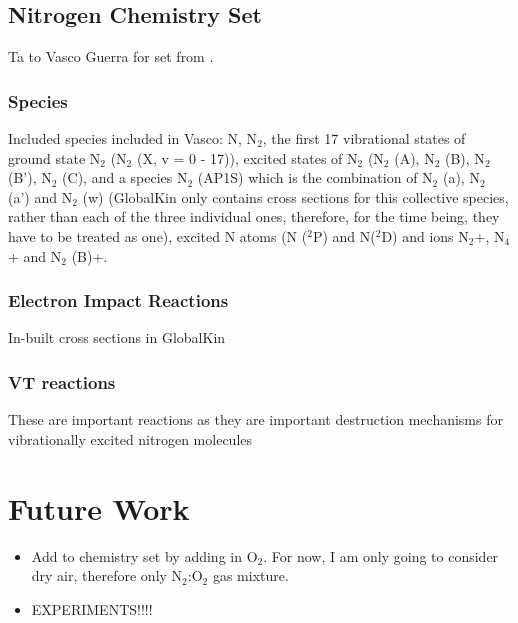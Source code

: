 \documentclass[11pt, oneside]{article}   	%
\begin{document}
\subsection{Nitrogen Chemistry Set}
Ta to Vasco Guerra for set from \cite{Kutasi2016tuning}.
\subsubsection{Species}
Included species included in Vasco: N, N$_2$, the first 17 vibrational states of ground state N$_2$ (N$_2$ (X, v = 0 - 17)), excited states of N$_2$ (N$_2$ (A), N$_2$ (B), N$_2$ (B'), N$_2$ (C), and a species N$_2$ (AP1S) which is the combination of N$_2$ (a), N$_2$ (a') and N$_2$ (w) (GlobalKin only contains cross sections for this collective species, rather than each of the three individual ones, therefore, for the time being, they have to be treated as one), excited N atoms (N ($^2$P) and N($^2$D) and ions N$_2$+, N$_4$+ and N$_2$ (B)+.
\subsubsection{Electron Impact Reactions}
In-built cross sections in GlobalKin
\subsubsection{VT reactions}
These are important reactions as they are important destruction mechanisms for vibrationally excited nitrogen molecules

\section{Future Work}
\begin{itemize}
\item Add to chemistry set by adding in O$_2$. For now, I am only going to consider dry air, therefore only N$_2$:O$_2$ gas mixture.
\item EXPERIMENTS!!!!
\end{itemize}



\scriptsize


\end{document}
